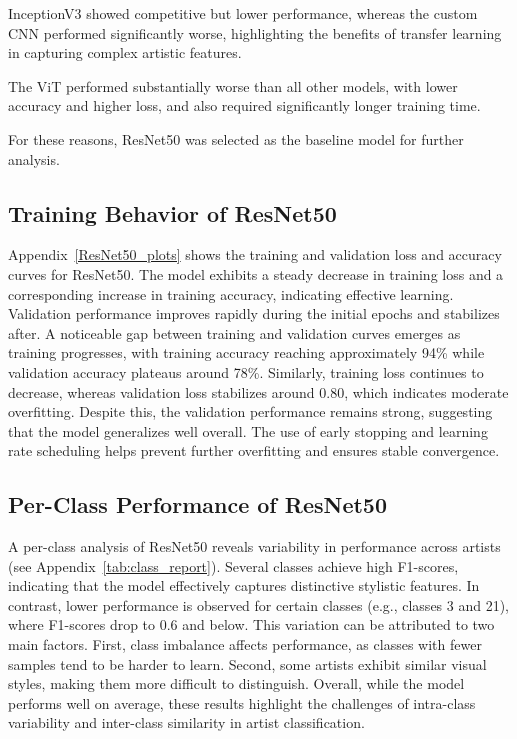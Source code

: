 \documentclass[12pt,a4paper]{article}
\begin{document}
InceptionV3 showed competitive but lower performance, whereas the custom CNN performed significantly worse, highlighting the benefits of transfer learning in capturing complex artistic features. 

The ViT performed substantially worse than all other models, with lower accuracy and higher loss, and also required significantly longer training time.

For these reasons, ResNet50 was selected as the baseline model for further analysis.

\subsection{Training Behavior of ResNet50}

Appendix~\ref{ResNet50_plots} shows the training and validation loss and accuracy curves for ResNet50.
The model exhibits a steady decrease in training loss and a corresponding increase in training accuracy, indicating effective learning. 
Validation performance improves rapidly during the initial epochs and stabilizes after.
A noticeable gap between training and validation curves emerges as training progresses, with training accuracy reaching approximately 94\% while validation accuracy plateaus around 78\%. 
Similarly, training loss continues to decrease, whereas validation loss stabilizes around 0.80, which indicates moderate overfitting.
Despite this, the validation performance remains strong, suggesting that the model generalizes well overall. 
The use of early stopping and learning rate scheduling helps prevent further overfitting and ensures stable convergence.

\subsection{Per-Class Performance of ResNet50}

A per-class analysis of ResNet50 reveals variability in performance across artists (see Appendix~\ref{tab:class_report}). 
Several classes achieve high F1-scores, indicating that the model effectively captures distinctive stylistic features. 
In contrast, lower performance is observed for certain classes (e.g., classes 3 and 21), where F1-scores drop to 0.6 and below.
This variation can be attributed to two main factors. 
First, class imbalance affects performance, as classes with fewer samples tend to be harder to learn. 
Second, some artists exhibit similar visual styles, making them more difficult to distinguish. 
Overall, while the model performs well on average, these results highlight the challenges of intra-class variability and inter-class similarity in artist classification.
\end{document}

